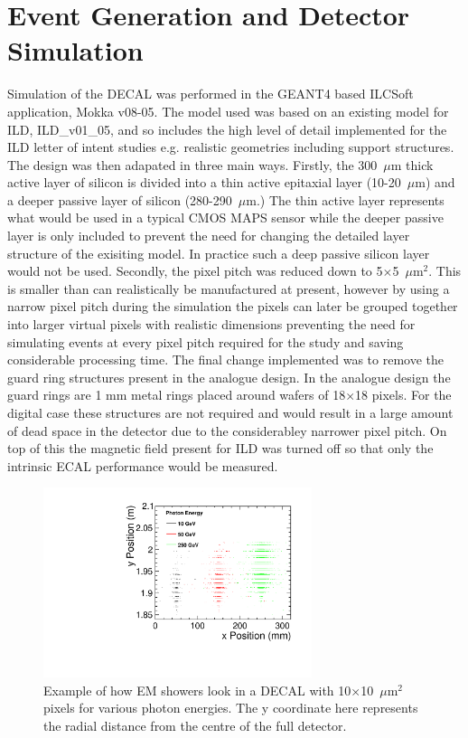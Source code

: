 \section{Event Generation and Detector Simulation}


Simulation of the \ac{DECAL} was performed in the GEANT4 based ILCSoft application, Mokka v08-05. The model used was based on an existing model for \ac{ILD}, ILD\_v01\_05, and so includes the high level of detail implemented for the \ac{ILD} letter of intent studies\cite{ILD} e.g. realistic geometries including support structures. The design was then adapated in three main ways. Firstly, the 300~$\mu$m thick active layer of silicon is divided into a thin active epitaxial layer (10-20~$\mu$m) and a deeper passive layer of silicon (280-290~$\mu$m.) The thin active layer represents what would be used in a typical \ac{CMOS} \ac{MAPS} sensor while the deeper passive layer is only included to prevent the need for changing the detailed layer structure of the exisiting model. In practice such a deep passive silicon layer would not be used. Secondly, the pixel pitch was reduced down to 5$\times$5~$\mu$m$^2$. This is smaller than can realistically be manufactured at present, however by using a narrow pixel pitch during the simulation the pixels can later be grouped together into larger virtual pixels with realistic dimensions preventing the need for simulating events at every pixel pitch required for the study and saving considerable processing time. The final change implemented was to remove the guard ring structures present in the analogue design. In the analogue design the guard rings are 1 mm metal rings placed around wafers of 18$\times$18 pixels. For the digital case these structures are not required and would result in a large amount of dead space in the detector due to the considerabley narrower pixel pitch. On top of this the magnetic field present for \ac{ILD} was turned off so that only the intrinsic \ac{ECAL} performance would be measured.

\begin{figure}
  \centering
  \includegraphics[width=0.7\textwidth,keepaspectratio]{DECALStudies/fig/ExampleEvents}
  \caption[Example of how EM showers look in a \ac{DECAL} with 10$\times$10~$\mu$m$^2$ pixels for various photon energies.]{Example of how EM showers look in a \ac{DECAL} with 10$\times$10~$\mu$m$^2$ pixels for various photon energies. The y coordinate here represents the radial distance from the centre of the full detector.}
  \label{fig:exampleevents}
\end{figure}


